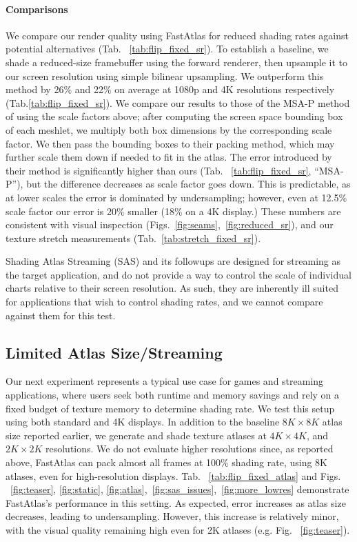 \paragraph*{Comparisons} We compare our render quality using FastAtlas for reduced shading rates against potential alternatives (Tab. ~\ref{tab:flip_fixed_sr}). To establish a baseline, we shade a reduced-size framebuffer using the forward renderer, then upsample it to our screen resolution using simple bilinear upsampling. We outperform this method by 26\% and 22\% on average at 1080p and 4K resolutions respectively (Tab.\ref{tab:flip_fixed_sr}).
We compare our results to those of the MSA-P method of \cite{Neff2022MSA}  using the scale factors above; after computing the screen space bounding box of each meshlet, we multiply both box dimensions by the corresponding scale factor. We then pass the bounding boxes to their packing method, which may further scale them down if needed to fit in the atlas. The error introduced by their method is significantly higher than ours (Tab. ~\ref{tab:flip_fixed_sr}, ``MSA-P''), but the difference decreases as scale factor goes down. This is predictable, as at lower scales the error is dominated by undersampling; however, even at 12.5\% scale factor our error is 20\% smaller (18\% on a 4K display.) These numbers are consistent with visual inspection (Figs.~\ref{fig:seams},~\ref{fig:reduced_sr}), and our texture stretch measurements (Tab.~\ref{tab:stretch_fixed_sr}).

Shading Atlas Streaming (SAS) \cite{mueller2018shading} and its followups \cite{hladky2019tessellated,hladky2021snakebinning} are designed for streaming as the target application, and do not provide a way to control the scale of individual charts relative to their screen resolution. As such, they are inherently ill suited for applications that wish to control shading rates, and we cannot compare against them for this test.

\subsection{Limited Atlas Size/Streaming}
\label{sec:compare_streaming}


Our next experiment represents a typical use case for games and streaming applications, where users seek both runtime and memory savings and rely on a fixed budget of texture memory to determine shading rate.  We test this setup using both standard and 4K displays. In addition to the baseline $8K \times 8K$ atlas size reported earlier, we generate and shade texture atlases at $4K \times4K$, and $2K\times2K$ resolutions. We do not evaluate higher resolutions since, as reported above, FastAtlas can pack almost all frames at 100\% shading rate, using 8K atlases, even for high-resolution displays. Tab. ~\ref{tab:flip_fixed_atlas} and Figs. ~\ref{fig:teaser}, \ref{fig:static}, \ref{fig:atlas},~\ref{fig:sas_issues},~\ref{fig:more_lowres} demonstrate FastAtlas's performance in this setting. As expected, \FLIP error increases as atlas size decreases, leading to undersampling. However, this increase is relatively minor, with the visual quality remaining high even for 2K atlases (e.g. Fig. ~\ref{fig:teaser}).

